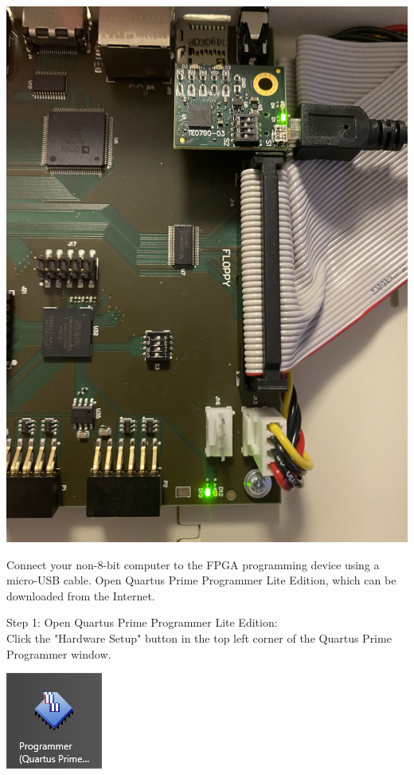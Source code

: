 \includegraphics[width=\linewidth]{images/jtag_detail_05.jpg}

Connect your non-8-bit computer to the FPGA programming device using a micro-USB cable.
Open Quartus Prime Programmer Lite Edition, which can be downloaded from the Internet.

\begin{minipage}{\linewidth}
Step 1: Open Quartus Prime Programmer Lite Edition: \\
Click the "Hardware Setup" button in the top left corner of
the Quartus Prime Programmer window.
  \begin{center}
  \includegraphics{images/max10_01.png}
  \end{center}
\end{minipage}

